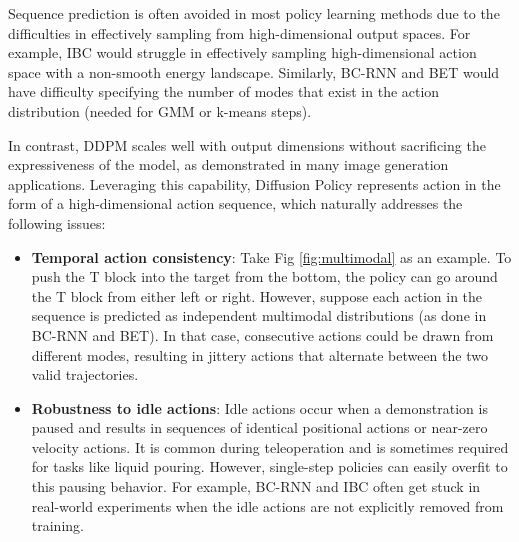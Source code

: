 

Sequence prediction is often avoided in most policy learning methods due to the difficulties in effectively sampling from high-dimensional output spaces. For example, IBC would struggle in effectively sampling high-dimensional action space with a non-smooth energy landscape. Similarly, BC-RNN and BET would have difficulty specifying the number of modes that exist in the action distribution (needed for GMM or k-means steps).  

In contrast, DDPM scales well with output dimensions without sacrificing the expressiveness of the model, as demonstrated in many image generation applications. Leveraging this capability, Diffusion Policy represents action in the form of a high-dimensional action sequence, which naturally addresses the following issues: 

\begin{itemize} [leftmargin=3mm]
    \item \textbf{Temporal action consistency}: Take Fig \ref{fig:multimodal} as an example. To push the T block into the target from the bottom, the policy can go around the T block from either left or right. However, suppose each action in the sequence is predicted as independent multimodal distributions (as done in BC-RNN and BET). In that case, consecutive actions could be drawn from different modes, resulting in jittery actions that alternate between the two valid trajectories. 

    \item \textbf{Robustness to idle actions}: Idle actions occur when a demonstration is paused and results in sequences of identical positional actions or near-zero velocity actions. It is common during teleoperation and is sometimes required for tasks like liquid pouring. However, single-step policies can easily overfit to this pausing behavior. For example, BC-RNN and IBC often get stuck in real-world experiments when the idle actions are not explicitly removed from training. 
    
\end{itemize}

